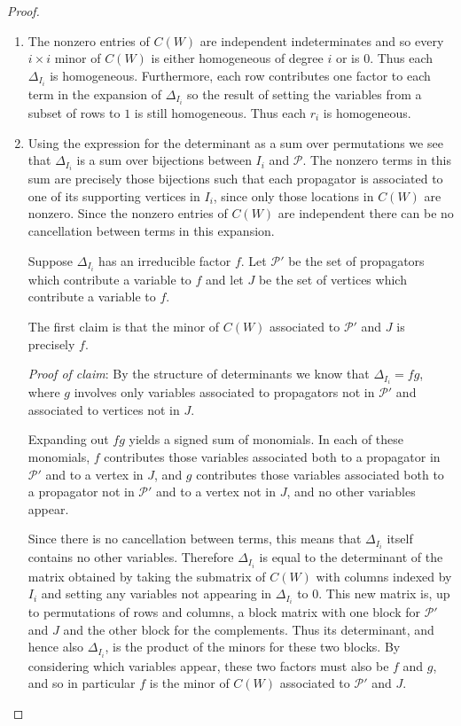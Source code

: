 \documentclass[11pt]{article}
\theoremstyle{remark}
\theoremstyle{definition}
\begin{document}
\begin{proof}
\begin{enumerate}
    \item The nonzero entries of $C(W)$ are independent indeterminates and so every $i\times i$ minor of $C(W)$ is either homogeneous of degree $i$ or is $0$.  Thus each $\Delta_{I_i}$ is homogeneous.  Furthermore, each row contributes one factor to each term in the expansion of $\Delta_{I_i}$ so the result of setting the variables from a subset of rows to $1$ is still homogeneous.  Thus each $r_i$ is homogeneous.
    \item Using the expression for the determinant as a sum over permutations we see that $\Delta_{I_i}$ is a sum over bijections between $I_i$ and $\mathcal{P}$.  The nonzero terms in this sum are precisely those bijections such that each propagator is associated to one of its supporting vertices in $I_i$, since only those locations in $C(W)$ are nonzero.  Since the nonzero entries of $C(W)$ are independent there can be no cancellation between terms in this expansion.

Suppose $\Delta_{I_i}$ has an irreducible factor $f$.  Let $\mathcal{P}'$ be the set of propagators which contribute a variable to $f$ and let $J$ be the set of vertices which contribute a variable to $f$.

The first claim is that the minor of $C(W)$ associated to $\mathcal{P}'$ and $J$ is precisely $f$.

{\em Proof of claim}: By the structure of determinants we know that $\Delta_{I_i} = fg$, where $g$ involves only variables associated to propagators not in $\mathcal{P}'$ and associated to vertices not in $J$.  

Expanding out $fg$ yields a signed sum of monomials. In each of these monomials, $f$ contributes those variables associated both to a propagator in $\mathcal{P}'$ and to a vertex in $J$, and $g$ contributes those variables associated both to a propagator not in $\mathcal{P}'$ and to a vertex not in $J$, and no other variables appear.  


Since there is no cancellation between terms, this means that $\Delta_{I_i}$ itself contains no other variables.  Therefore $\Delta_{I_i}$ is equal to the determinant of the matrix obtained by taking the submatrix of $C(W)$ with columns indexed by $I_i$ and setting any variables not appearing in $\Delta_{I_i}$ to $0$.  This new matrix is, up to permutations of rows and columns, a block matrix with one block for $\mathcal{P}'$ and $J$ and the other block for the complements.  Thus its determinant, and hence also $\Delta_{I_i}$, is the product of the minors for these two blocks.  By considering which variables appear, these two factors must also be $f$ and $g$, and so in particular $f$ is the minor of $C(W)$ associated to $\mathcal{P}'$ and $J$.


\end{enumerate}
\end{proof}
\end{document}
